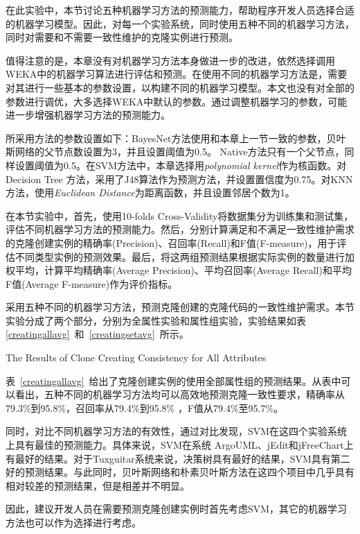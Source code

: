 在此实验中，本节讨论五种机器学习方法的预测能力，帮助程序开发人员选择合适的机器学习模型。因此，对每一个实验系统，同时使用五种不同的机器学习方法，同时对需要和不需要一致性维护的克隆实例进行预测。

值得注意的是，本章没有对机器学习方法本身做进一步的改进，依然选择调用WEKA中的机器学习算法进行评估和预测。在使用不同的机器学习方法是，需要对其进行一些基本的参数设置，以构建不同的机器学习模型。本文也没有对全部的参数进行调优，大多选择WEKA中默认的参数。通过调整机器学习的参数，可能进一步增强机器学习方法的预测能力。

所采用方法的参数设置如下：BayesNet方法使用和本章上一节一致的参数，贝叶斯网络的父节点数设置为3，并且设置阈值为0.5。 Native方法只有一个父节点，同样设置阈值为0.5。在SVM方法中，本章选择用{\em polynomial kernel\/}作为核函数。对Decision Tree 方法，采用了J48算法作为预测方法，并设置置信度为0.75。对KNN方法，使用{\em Euclidean Distance\/}为距离函数，并且设置邻居个数为1。

在本节实验中，首先，使用10-folds Cross-Validity将数据集分为训练集和测试集，评估不同机器学习方法的预测能力。然后，分别计算满足和不满足一致性维护需求的克隆创建实例的精确率(Precision)、召回率(Recall)和F值(F-measure)，用于评估不同类型实例的预测效果。最后，将这两组预测结果根据实际实例的数量进行加权平均，计算平均精确率(Average Precision)、平均召回率(Average Recall)和平均F值(Average F-measure)作为评价指标。

采用五种不同的机器学习方法，预测克隆创建的克隆代码的一致性维护需求。本节实验分成了两个部分，分别为全属性实验和属性组实验，实验结果如表\ref{creatingallavg}~和~\ref{creatingsetavg}~所示。

{The Results of Clone Creating Consistency for All Attributes}

表~\ref{creatingallavg}~给出了克隆创建实例的使用全部属性组的预测结果。从表中可以看出，五种不同的机器学习方法均可以高效地预测克隆一致性要求，精确率从79.3\%到95.8\%，召回率从79.4\%到95.8\% ，F值从79.4\%至95.7\%。

同时，对比不同机器学习方法的有效性，通过对比发现，SVM在这四个实验系统上具有最佳的预测能力。具体来说，SVM在系统 ArgoUML、jEdit和jFreeChart上有最好的结果。对于{Tuxguitar}系统来说，决策树具有最好的结果，SVM具有第二好的预测结果。与此同时，贝叶斯网络和朴素贝叶斯方法在这四个项目中几乎具有相对较差的预测结果，但是相差并不明显。

因此，建议开发人员在需要预测克隆创建实例时首先考虑SVM，其它的机器学习方法也可以作为选择进行考虑。

